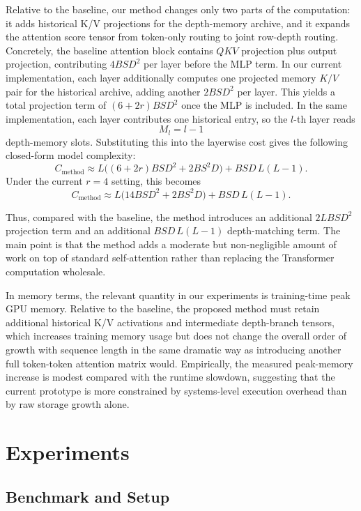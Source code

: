 \documentclass[11pt]{article}
\begin{document}
Relative to the baseline, our method changes only two parts of the computation: it adds historical K/V projections for the depth-memory archive, and it expands the attention score tensor from token-only routing to joint row-depth routing. Concretely, the baseline attention block contains $QKV$ projection plus output projection, contributing $4BSD^2$ per layer before the MLP term. In our current implementation, each layer additionally computes one projected memory $K/V$ pair for the historical archive, adding another $2BSD^2$ per layer. This yields a total projection term of $(6+2r)BSD^2$ once the MLP is included. In the same implementation, each layer contributes one historical entry, so the $l$-th layer reads
\[
M_l = l-1
\]
depth-memory slots. Substituting this into the layerwise cost gives the following closed-form model complexity:
\[
C_{\text{method}} \approx L\bigl((6+2r)BSD^2 + 2BS^2D\bigr) + BSD\,L(L-1).
\]
Under the current $r=4$ setting, this becomes
\[
C_{\text{method}} \approx L\bigl(14BSD^2 + 2BS^2D\bigr) + BSD\,L(L-1).
\]

Thus, compared with the baseline, the method introduces an additional $2LBSD^2$ projection term and an additional $BSD\,L(L-1)$ depth-matching term. The main point is that the method adds a moderate but non-negligible amount of work on top of standard self-attention rather than replacing the Transformer computation wholesale.

In memory terms, the relevant quantity in our experiments is training-time peak GPU memory. Relative to the baseline, the proposed method must retain additional historical K/V activations and intermediate depth-branch tensors, which increases training memory usage but does not change the overall order of growth with sequence length in the same dramatic way as introducing another full token-token attention matrix would. Empirically, the measured peak-memory increase is modest compared with the runtime slowdown, suggesting that the current prototype is more constrained by systems-level execution overhead than by raw storage growth alone.

\section{Experiments}

\subsection{Benchmark and Setup}
\end{document}
